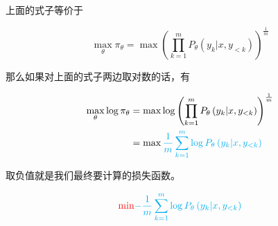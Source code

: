 \documentclass[lang=cn,newtx,10pt,scheme=chinese]{elegantbook}
\begin{document}
上面的式子等价于

\begin{equation}
\max_\theta\pi_\theta = \max\left( \prod_{k=1}^{m}P_\theta\left( y_k|x,y_{<k} \right) \right)^{\frac{1}{m}}
\end{equation}

那么如果对上面的式子两边取对数的话，有

\begin{equation}
\begin{aligned}
\max_\theta\log\pi_\theta &= \max\log\left( \prod_{k=1}^{m}P_\theta\left( y_k|x,y_{<k} \right) \right)^{\frac{1}{m}} \\
&= \max{\color{cyan}\frac{1}{m}\sum_{k=1}^{m}\log P_\theta\left( y_k|x,y_{<k} \right)}
\end{aligned}
\end{equation}

取负值就是我们最终要计算的损失函数。

\begin{equation}
{\color{red}\min}{\color{cyan}-\frac{1}{m}\sum_{k=1}^{m}\log P_\theta\left( y_k|x,y_{<k} \right)}
\end{equation}
\end{document}
